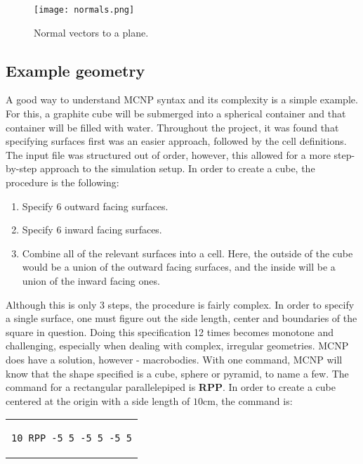 \begin{figure}[!htbp]
\centering
\texttt{[image: normals.png]}
\caption{Normal vectors to a plane.}
\label{fig:planes}
\end{figure}
\subsection{Example geometry}

A good way to understand MCNP syntax and its complexity is a simple example. For this, a graphite cube will be submerged into a spherical container and that container will be filled with water. Throughout the project, it was found that specifying surfaces first was an easier approach, followed by the cell definitions. The input file was structured out of order, however, this allowed for a more step-by-step approach to the simulation setup. In order to create a cube, the procedure is the following:

\begin{enumerate}
	\item Specify 6 outward facing surfaces.
	\item Specify 6 inward facing surfaces.
	\item Combine all of the relevant surfaces into a cell. Here, the outside of the cube would be a union of the outward facing surfaces, and the inside will be a union of the inward facing ones.
\end{enumerate}

Although this is only 3 steps, the procedure is fairly complex. In order to specify a single surface, one must figure out the side length, center and boundaries of the square in question. Doing this specification 12 times becomes monotone and challenging, especially when dealing with complex, irregular geometries. MCNP does have a solution, however - macrobodies. With one command, MCNP will know that the shape specified is a cube, sphere or pyramid, to name a few. The command for a rectangular parallelepiped is \textbf{RPP}. In order to create a cube centered at the origin with a side length of $10$cm, the command is:

\begin{center}
\begin{tabular}{c}
\begin{lstlisting}
10 RPP -5 5 -5 5 -5 5
\end{lstlisting}
\end{tabular}
\end{center}

